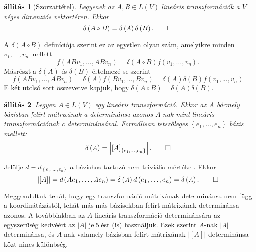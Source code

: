 \documentclass[9pt, a4paper, showtrims]{memoir}
\makeatletter
\renewenvironment{proof}[1][\proofname]
    {\par\pushQED{\qed}%
    \normalfont \topsep6\p@\@plus6\p@\relax
    \trivlist
    \item[\hskip\labelsep
        \itshape
    #1\@addpunct{:}]\ignorespaces}
    {\popQED\endtrivlist\@endpefalse}
\theoremstyle{plain}
\newtheorem{proposition}{állítás}[chapter]
\theoremstyle{remark}
\theoremstyle{definition}
\makeatother
\begin{document}
\begin{proposition}[Szorzattétel]
    Legyenek az $A,B\in L\left( V \right)$ lineáris transzformációk a $V$ véges dimenziós vektortéren.
    Ekkor 
    \[
        \delta\left( A\circ B\right) 
        =
        \delta\left( A\right) \delta\left( B\right).
        \qedhere
    \]
\end{proposition}
\begin{proof}
A $\delta \left( A\circ B\right) $ definíciója szerint ez az egyetlen olyan
szám, amelyikre minden $v_{1},\ldots ,v_{n}$ mellett 
\[
f\left( ABv_{1},\ldots ,ABv_{n}\right) =\delta \left( A\circ B\right)
f\left( v_{1},\ldots ,v_{n}\right) . 
\]
Másrészt a $\delta \left( A\right) $ és $\delta \left( B\right) $ értelmezé%
se szerint 
\[
f\left( ABv_{1},\ldots ,ABv_{n}\right) =\delta \left( A\right) f\left(
Bv_{1},\ldots ,Bv_{n}\right) =\delta \left( A\right) \delta \left( B\right)
f\left( v_{1},\ldots ,v_{n}\right) 
\]
E két utolsó sort összevetve kapjuk, hogy $\delta \left( A\circ B\right)
=\delta \left( A\right) \delta \left( B\right) .$
\end{proof}

\begin{proposition}
    Legyen $A\in L\left( V\right)$ egy lineáris transzformáció.
    Ekkor az $A$ bármely bázisban felírt mátrixának a determinánsa azonos 
    $A$-nak mint lineáris transzformációnak a determinánsával.
    Formálisan tetszőleges $\left\{ e_1,\dots,e_n \right\}$ bázis mellett:
    \[
        \delta \left( A\right) 
        =
        \left| 
            \left[
                A
            \right]_{\left\{ e_{1},\ldots ,e_{n}\right\} } 
        \right|.\qedhere
    \]
\end{proposition}
\begin{proof}
    Jelölje $d=d_{\left\{e_1,\dots,e_n\right\}}$ a bázishoz tartozó nem triviális mértéket.
    Ekkor
    \[
        \left| \left[ A\right] \right| =d\left( Ae_{1},\ldots ,Ae_{n}\right) =\delta
        \left( A\right) d\left( e_{1},\ldots ,e_{n}\right) =\delta \left( A\right) . \qedhere
    \]
\end{proof}

Meggondoltuk tehát, hogy egy transzformáció mátrixának determinánsa nem függ a koordinátázástól,
tehát más-más bázisokban felírt mátrixának determinánsa azonos.
A továbbiakban az $A$ lineáris transzformáció determinánsára az egyszerűség kedvéért az $|A|$ jelölést (is) használjuk.
Ezek szerint $A$-nak $|A|$ determinánsa, 
és $A$-nak valamely bázisban felírt mátrixának $|[A]|$ determinánsa közt nincs különbség.
\end{document}
